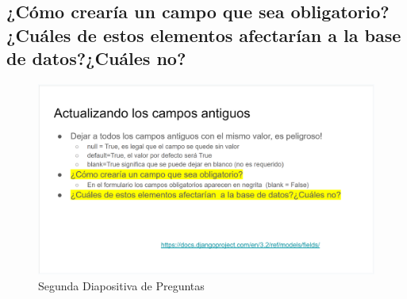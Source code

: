 \documentclass{article}
\begin{document}
        \subsection{¿Cómo crearía un campo que sea obligatorio?¿Cuáles de estos elementos afectarían a la base de datos?¿Cuáles no?}
        \begin{figure}[H]
            \centering
            \includegraphics[width=1\linewidth]{img/Pregunta2.png}
            \caption{Segunda Diapositiva de Preguntas}
            \label{fig:enter-label}
        \end{figure}
\end{document}
